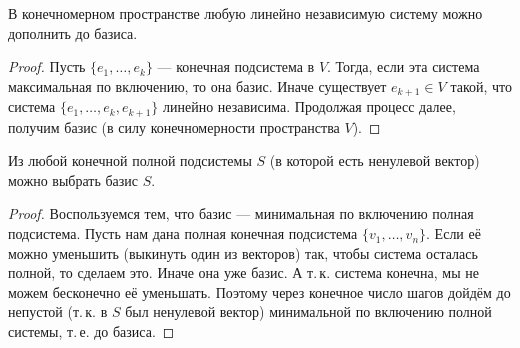 \begin{theorem}
    В конечномерном пространстве любую линейно независимую систему можно дополнить до базиса.
\end{theorem}

\begin{proof}
    Пусть $\{e_1, \ldots, e_k\}$ --- конечная подсистема в $V$. Тогда, если эта система максимальная по включению, то она базис. Иначе существует $e_{k + 1} \in V$ такой, что система $\{e_1, \ldots, e_k, e_{k + 1}\}$ линейно независима. Продолжая процесс далее, получим базис (в силу конечномерности пространства $V$).
\end{proof}

\begin{theorem}
    Из любой конечной полной подсистемы $S$ (в которой есть ненулевой вектор) можно выбрать базис $S$.
\end{theorem}

\begin{proof}
    Воспользуемся тем, что базис --- минимальная по включению полная подсистема. Пусть нам дана полная конечная подсистема $\{v_1, \ldots, v_n\}$. Если её можно уменьшить (выкинуть один из векторов) так, чтобы система осталась полной, то сделаем это. Иначе она уже базис. А т.\,к. система конечна, мы не можем бесконечно её уменьшать. Поэтому через конечное число шагов дойдём до непустой (т.\,к. в $S$ был ненулевой вектор) минимальной по включению полной системы, т.\,е. до базиса.
\end{proof}


